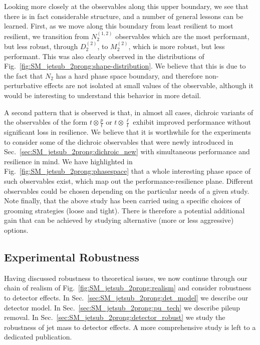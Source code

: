 Looking more closely at the observables along this upper boundary, we see that there is in fact considerable structure, and a number of general lessons can be learned.
%
First, as we move along this boundary from least resilient to most resilient, we transition from $N_2^{(1,2)}$ observables which are the most performant, but less robust, through $D_2^{(2)}$, to $M_2^{(2)}$, which is more robust, but less performant.
%
This was also clearly observed in the distributions of Fig.~\ref{fig:SM_jetsub_2prong:shape-distribution}.
%
We believe that this is due to the fact that $N_2$ has a hard phase space boundary, and therefore non-perturbative effects are not isolated at small values of the observable, although it would be interesting to understand this behavior in more detail. 

A second pattern that is observed is that, in almost all cases, dichroic variants of the observables of the form $t\otimes \frac{p}{t}$ or $t\otimes\frac{\ell}{t}$ exhibit improved performance without significant loss in resilience.
%
We believe that it is worthwhile for the experiments to consider some of the dichroic observables that were newly introduced in Sec.~\ref{sec:SM_jetsub_2prong:dichroic_new} with simultaneous performance and resilience in mind.
%
We have highlighted in Fig.~\ref{fig:SM_jetsub_2prong:phasespace} that a whole interesting phase space of such observables exist, which map out the performance-resilience plane.
%
Different observables could be chosen depending on the particular
needs of a given study.
%
Note finally, that the above study has been carried using a specific
choices of grooming strategies (loose and tight). There is therefore a
potential additional gain that can be achieved by studying alternative
(more or less aggressive) options.


\subsection{Experimental Robustness}\label{sec:SM_jetsub_2prong:exp}

Having discussed robustness to theoretical issues, we now continue through our chain of realism of Fig.~\ref{fig:SM_jetsub_2prong:realism} and consider robustness to detector effects.
%
In Sec.~\ref{sec:SM_jetsub_2prong:det_model} we describe our detector model.
%
In Sec.~\ref{sec:SM_jetsub_2prong:pu_tech} we describe pileup removal.
%
In Sec.~\ref{sec:SM_jetsub_2prong:detector_robust} we study the robustness of jet mass to detector effects.
%
A more comprehensive study is left to a dedicated publication.

